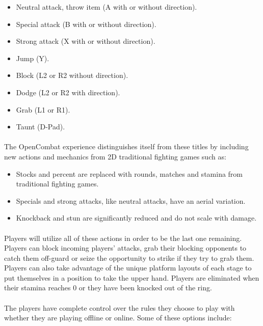 \begin{itemize}
    \item Neutral attack, throw item (A with or without direction).
    \item Special attack (B with or without direction).
    \item Strong attack (X with or without direction).
    \item Jump (Y).
    \item Block (L2 or R2 without direction).
    \item Dodge (L2 or R2 with direction).
    \item Grab (L1 or R1).
    \item Taunt (D-Pad).
\end{itemize}

\paragraph{} The OpenCombat experience distinguishes itself from these titles by including new actions and mechanics from 2D traditional fighting games such as:

\begin{itemize}
    \item Stocks and percent are replaced with rounds, matches and stamina from traditional fighting games.
    \item Specials and strong attacks, like neutral attacks, have an aerial variation.
    \item Knockback and stun are significantly reduced and do not scale with damage.
\end{itemize}

\paragraph{} Players will utilize all of these actions in order to be the last one remaining. Players can block incoming players' attacks, grab their blocking opponents to catch them off-guard or seize the opportunity to strike if they try to grab them. Players can also take advantage of the unique platform layouts of each stage to put themselves in a position to take the upper hand. Players are eliminated when their stamina reaches 0 or they have been knocked out of the ring.

\paragraph{} The players have complete control over the rules they choose to play with whether they are playing offline or online. Some of these options include:

